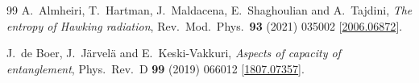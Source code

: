 \documentclass[11pt,letterpaper]{article}
\theoremstyle{plain}
\theoremstyle{definition}
\theoremstyle{remark}
\begin{document}
\begin{thebibliography}{99}
A.~Almheiri, T.~Hartman, J.~Maldacena, E.~Shaghoulian and A.~Tajdini,
\emph{The entropy of Hawking radiation},
Rev.\ Mod.\ Phys.\ \textbf{93} (2021) 035002
[\href{https://arxiv.org/abs/2006.06872}{2006.06872}].

J.~de Boer, J.~J\"arvel\"a and E.~Keski-Vakkuri, \emph{Aspects of capacity of entanglement},
Phys.\ Rev.\ D \textbf{99} (2019) 066012
[\href{https://arxiv.org/abs/1807.07357}{1807.07357}].

\end{thebibliography}
\end{document}
